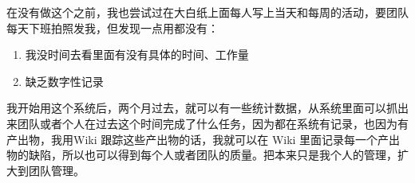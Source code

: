 在没有做这个之前，我也尝试过在大白纸上面每人写上当天和每周的活动，要团队每天下班拍照发我，但发现一点用都没有：

\begin{enumerate}
\tightlist
\item
  我没时间去看里面有没有具体的时间、工作量
\item
  缺乏数字性记录
\end{enumerate}

我开始用这个系统后，两个月过去，就可以有一些统计数据，从系统里面可以抓出来团队或者个人在过去这个时间完成了什么任务，因为都在系统有记录，也因为有产出物，我用Wiki
跟踪这些产出物的话，我就可以在 Wiki
里面记录每一个产出物的缺陷，所以也可以得到每个人或者团队的质量。把本来只是我个人的管理，扩大到团队管理。


